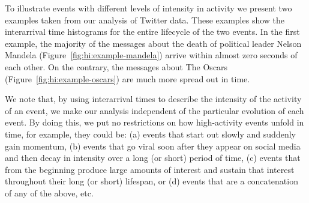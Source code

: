 

To illustrate events with different levels of intensity in activity we present
two examples taken from our analysis of Twitter data. 
%
These examples show the interarrival time histograms for the entire lifecycle of
the two events. 
%
In the first example, the majority of the messages about the death of political
leader Nelson Mandela (Figure~\ref{fig:hi:example-mandela}) arrive within almost
zero seconds of each other. 
%
On the contrary, the messages about The Oscars
(Figure~\ref{fig:hi:example-oscars}) are much more spread out in time.


We note that, by using interarrival times to describe the intensity of the
activity of an event, we make our analysis independent of the particular
evolution of each event. 
%
By doing this, we put no restrictions on how high-activity events unfold in
time, for example, they could be: 
%
(a) events that start out slowly and suddenly gain momentum, 
%
(b) events that go viral soon after they appear on social media and then decay
in intensity over a long (or short) period of time, 
%
(c) events that from the beginning produce large amounts of interest and sustain
that interest throughout their long (or short) lifespan, or 
%
(d) events that are a concatenation of any of the above, etc.

